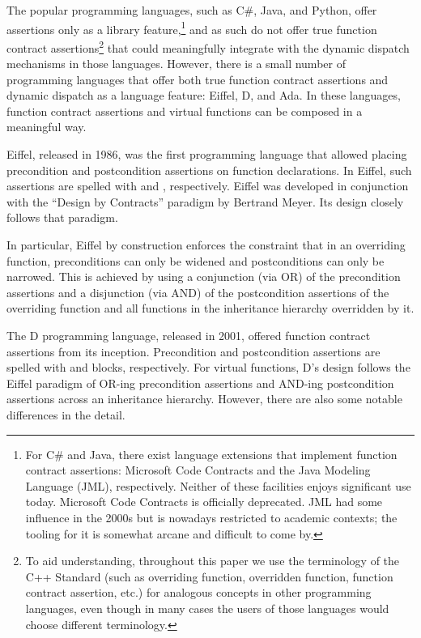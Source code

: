 The popular programming languages, such as C\#, Java, and Python, offer assertions only as a library feature,\footnote{For C\# and Java, there exist language extensions that implement function contract assertions: Microsoft Code Contracts and the Java Modeling Language (JML), respectively. Neither of these facilities enjoys significant use today. Microsoft Code Contracts is officially deprecated. JML had some influence in the 2000s but is nowadays restricted to academic contexts; the tooling for it is somewhat arcane and difficult to come by.} and as such do not offer true function contract assertions\footnote{To aid understanding, throughout this paper we use the terminology of the C++ Standard (such as overriding function, overridden function, function contract assertion, etc.) for analogous concepts in other programming languages, even though in many cases the users of those languages would choose different terminology.} that could meaningfully integrate with the  dynamic dispatch mechanisms in those languages. However, there is a small number of programming languages that offer both true function contract assertions and dynamic dispatch as a language feature: Eiffel, D, and Ada. In these languages, function contract assertions and virtual functions can be composed in a meaningful way.

Eiffel, released in 1986, was the first programming language that allowed placing precondition and postcondition assertions on function declarations. In Eiffel, such assertions are spelled with  and , respectively. Eiffel was developed in conjunction with the ``Design by Contracts'' paradigm by Bertrand Meyer. Its design closely follows that paradigm.

In particular, Eiffel by construction enforces the constraint that in an overriding function, preconditions can only be widened and postconditions can only be narrowed. This is achieved by using a conjunction (via OR) of the precondition assertions and a disjunction (via AND) of the postcondition assertions of the overriding function and all functions in the inheritance hierarchy overridden by it.

The D programming language, released in 2001, offered function contract assertions from its inception. Precondition and postcondition assertions are spelled with  and  blocks, respectively. For virtual functions, D's design follows the Eiffel paradigm of OR-ing precondition assertions and AND-ing postcondition assertions across an inheritance hierarchy. However, there are also some notable differences in the detail.

